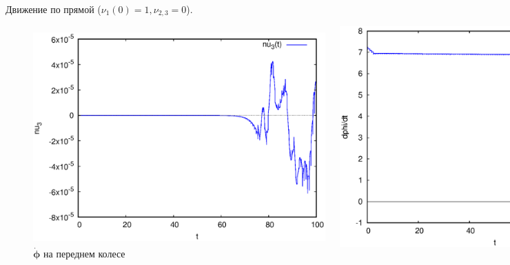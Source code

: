 \documentclass{beamer}
\begin{document}
\begin{frame}{Движение по прямой ($\nu_1(0) = 1, \nu_{2,3} = 0$).}
\begin{figure}[H]
\begin{columns}
                \caption{Траектория}
                \centering
                \includegraphics[width=\linewidth]{pic/straight_100/nu3.eps}
                \vspace{-15pt}
                \caption{Угловая скорость экипажа}
                \centering
                \includegraphics[width=\linewidth]{pic/straight_100/nus1.eps}
                \vspace{-15pt}
                \caption{$\dot{\mathbf{\phi}}$ на переднем колесе}
        \end{columns}
    \end{figure}
\end{frame}
\end{document}
